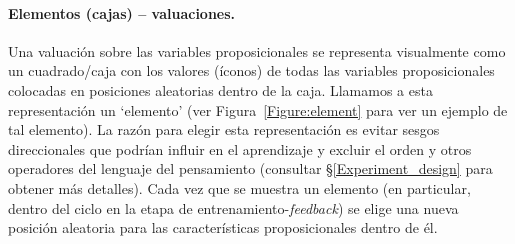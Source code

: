 \paragraph{Elementos (cajas) -- valuaciones.} Una valuación sobre las variables proposicionales se representa visualmente como un cuadrado/caja con los valores (íconos) de todas las variables proposicionales colocadas en posiciones aleatorias dentro de la caja. Llamamos a esta representación un `elemento' (ver Figura~\ref{Figure:element} para ver un ejemplo de tal elemento). La razón para elegir esta representación es evitar sesgos direccionales que podrían influir en el aprendizaje y excluir el orden y otros operadores del lenguaje del pensamiento (consultar \S\ref{Experiment_design} para obtener más detalles).
Cada vez que se muestra un elemento (en particular, dentro del ciclo en la etapa de entrenamiento-{\em feedback}) se elige una nueva posición aleatoria para las características proposicionales dentro de él.


